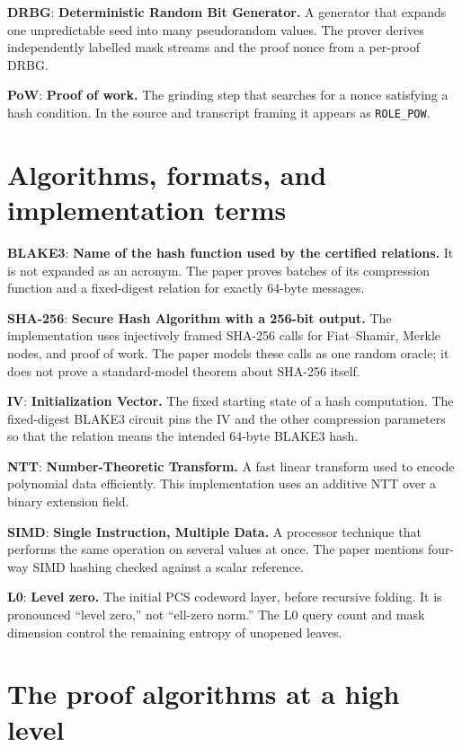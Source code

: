 \documentclass[11pt]{article}
\newcommand{\term}[2]{\textbf{#1}: \textbf{#2}}
\begin{document}
\term{DRBG}{Deterministic Random Bit Generator.}
A generator that expands one unpredictable seed into many pseudorandom values.
The prover derives independently labelled mask streams and the proof nonce
from a per-proof DRBG.

\term{PoW}{Proof of work.}
The grinding step that searches for a nonce satisfying a hash condition. In
the source and transcript framing it appears as \texttt{ROLE\_POW}.

\section*{Algorithms, formats, and implementation terms}

\term{BLAKE3}{Name of the hash function used by the certified relations.}
It is not expanded as an acronym. The paper proves batches of its compression
function and a fixed-digest relation for exactly 64-byte messages.

\term{SHA-256}{Secure Hash Algorithm with a 256-bit output.}
The implementation uses injectively framed SHA-256 calls for Fiat--Shamir,
Merkle nodes, and proof of work. The paper models these calls as one random
oracle; it does not prove a standard-model theorem about SHA-256 itself.

\term{IV}{Initialization Vector.}
The fixed starting state of a hash computation. The fixed-digest BLAKE3 circuit
pins the IV and the other compression parameters so that the relation means
the intended 64-byte BLAKE3 hash.

\term{NTT}{Number-Theoretic Transform.}
A fast linear transform used to encode polynomial data efficiently. This
implementation uses an additive NTT over a binary extension field.

\term{SIMD}{Single Instruction, Multiple Data.}
A processor technique that performs the same operation on several values at once.
The paper mentions four-way SIMD hashing checked against a scalar reference.

\term{L0}{Level zero.}
The initial PCS codeword layer, before recursive folding. It is pronounced
``level zero,'' not ``ell-zero norm.'' The L0 query count and mask dimension
control the remaining entropy of unopened leaves.

\section*{The proof algorithms at a high level}
\end{document}
